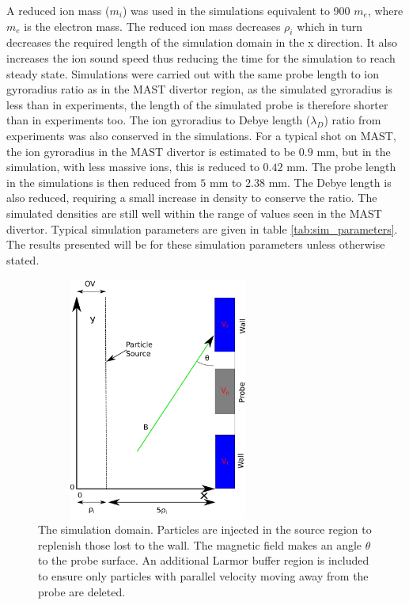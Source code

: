 A reduced ion mass ($m_i$) was used in the simulations equivalent to 900 $m_e$, where $m_e$ is the electron mass. The reduced ion mass decreases $\rho_i$ which in turn decreases the required length of the simulation domain in the x direction. It also increases the ion sound speed thus reducing the time for the simulation to reach steady state. Simulations were carried out with the same probe length to ion gyroradius ratio as in the MAST divertor region, as the simulated gyroradius is less than in experiments, the length of the simulated probe is therefore shorter than in experiments too. The ion gyroradius to Debye length ($\lambda_D$) ratio from experiments was also conserved in the simulations. For a typical shot on MAST, the ion gyroradius in the MAST divertor is estimated to be $0.9$ mm, but in the simulation, with less massive ions, this is reduced to $0.42$ mm. The probe length in the simulations is then reduced from $5$ mm to $2.38$ mm. The Debye length is also reduced, requiring a small increase in density to conserve the ratio. The simulated densities are still well within the range of values seen in the MAST divertor. Typical simulation parameters are given in table \ref{tab:sim_parameters}. The results presented will be for these simulation parameters unless otherwise stated.
\begin{figure}[H]
	\centering
	\includegraphics[width=8cm, height = 8cm]{gap_model.pdf}
	\caption{The simulation domain. Particles are injected in the source region to replenish those lost to the wall. The magnetic field makes an angle $\theta$ to the probe surface. An additional Larmor buffer region is included to ensure only particles with parallel velocity moving away from the probe are deleted.}
	\label{fig:2D_domain}
\end{figure}


